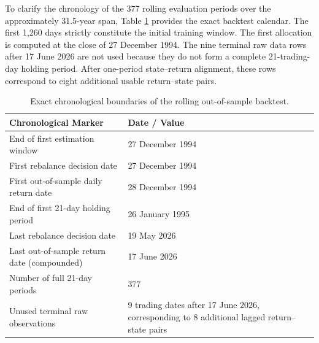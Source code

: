 \documentclass[smallextended]{svjour3}
\begin{document}
To clarify the chronology of the 377 rolling evaluation periods over the approximately 31.5-year span, Table \ref{tab:timeline} provides the exact backtest calendar. The first 1,260 days strictly constitute the initial training window. The first allocation is computed at the close of 27 December 1994. The nine terminal raw data rows after 17 June 2026 are not used because
they do not form a complete 21-trading-day holding period. After one-period
state--return alignment, these rows correspond to eight additional usable
return--state pairs.

\begin{table}[htbp]
\centering
\caption{Exact chronological boundaries of the rolling out-of-sample backtest.}
\label{tab:timeline}
\begin{tabular}{ll}
\toprule
\textbf{Chronological Marker} & \textbf{Date / Value} \\
\midrule
End of first estimation window & 27 December 1994 \\
First rebalance decision date & 27 December 1994 \\
First out-of-sample daily return date & 28 December 1994 \\
End of first 21-day holding period & 26 January 1995 \\
Last rebalance decision date & 19 May 2026 \\
Last out-of-sample return date (compounded) & 17 June 2026 \\
Number of full 21-day periods & 377 \\
Unused terminal raw observations & 9 trading dates after 17 June 2026,
corresponding to 8 additional lagged return--state pairs \\
\bottomrule
\end{tabular}
\end{table}
\end{document}
